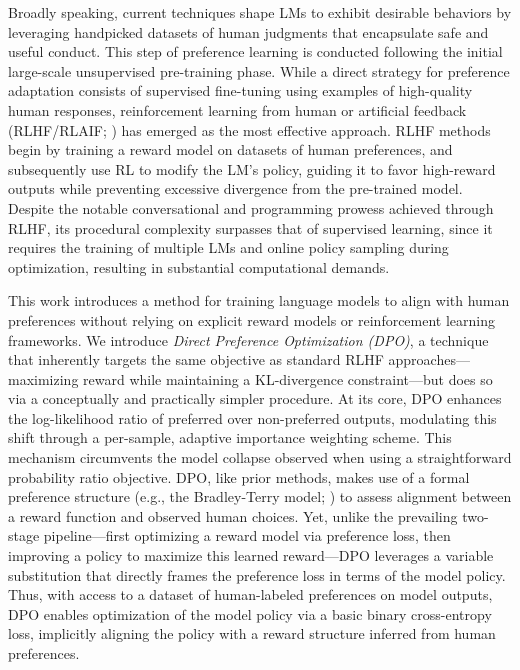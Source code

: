 Broadly speaking, current techniques shape LMs to exhibit desirable behaviors by leveraging handpicked datasets of human judgments that encapsulate safe and useful conduct. This step of preference learning is conducted following the initial large-scale unsupervised pre-training phase. While a direct strategy for preference adaptation consists of supervised fine-tuning using examples of high-quality human responses, reinforcement learning from human or artificial feedback (RLHF/RLAIF; \citep{christiano2017deep, bai2022constitutional}) has emerged as the most effective approach. RLHF methods begin by training a reward model on datasets of human preferences, and subsequently use RL to modify the LM’s policy, guiding it to favor high-reward outputs while preventing excessive divergence from the pre-trained model. Despite the notable conversational and programming prowess achieved through RLHF, its procedural complexity surpasses that of supervised learning, since it requires the training of multiple LMs and online policy sampling during optimization, resulting in substantial computational demands.

This work introduces a method for training language models to align with human preferences without relying on explicit reward models or reinforcement learning frameworks. We introduce \textit{{Direct Preference Optimization} (DPO)}, a technique that inherently targets the same objective as standard RLHF approaches—maximizing reward while maintaining a KL-divergence constraint—but does so via a conceptually and practically simpler procedure. At its core, DPO enhances the log-likelihood ratio of preferred over non-preferred outputs, modulating this shift through a per-sample, adaptive importance weighting scheme. This mechanism circumvents the model collapse observed when using a straightforward probability ratio objective. DPO, like prior methods, makes use of a formal preference structure (e.g., the Bradley-Terry model; \cite{bradley1952rankanalysis}) to assess alignment between a reward function and observed human choices. Yet, unlike the prevailing two-stage pipeline—first optimizing a reward model via preference loss, then improving a policy to maximize this learned reward—DPO leverages a variable substitution that directly frames the preference loss in terms of the model policy. Thus, with access to a dataset of human-labeled preferences on model outputs, DPO enables optimization of the model policy via a basic binary cross-entropy loss, implicitly aligning the policy with a reward structure inferred from human preferences.

